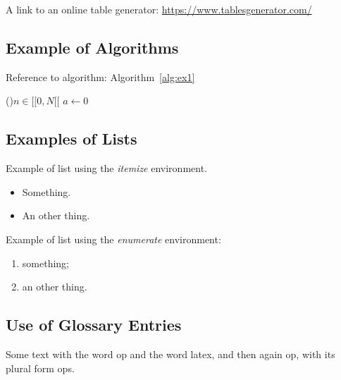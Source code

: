 A link to an online table generator: \url{https://www.tablesgenerator.com/}


\newpage

\subsection{Example of Algorithms}

Reference to algorithm: Algorithm~\ref{alg:ex1}

\begin{algorithm}[h]
    \caption{A Simple Algorithm with Comments}\label{alg:ex1}
    \For(){$n \in [\![0, N[\![$}{
        $a \gets 0$\;
        \For{$i \in [\![0, 10[\![$}{
            $rand \gets \mathrm{Random}(0, 10)$\Comment*[r]{An other comment}
            $a \gets a + i \times rand$\;
        }
    }
\end{algorithm}

\subsection{Examples of Lists}

Example of list using the \textit{itemize} environment.
\begin{itemize}
    \item Something.
    \item An other thing.
\end{itemize}

\bigskip

\noindent Example of list using the \textit{enumerate} environment:
\begin{enumerate}
    \item something;
    \item an other thing.
\end{enumerate}

\subsection{Use of Glossary Entries}

Some text with the word \gls{op} and the word \gls{latex}, and then again \gls{op}, with its plural form \glspl{op}.

\bigskip

